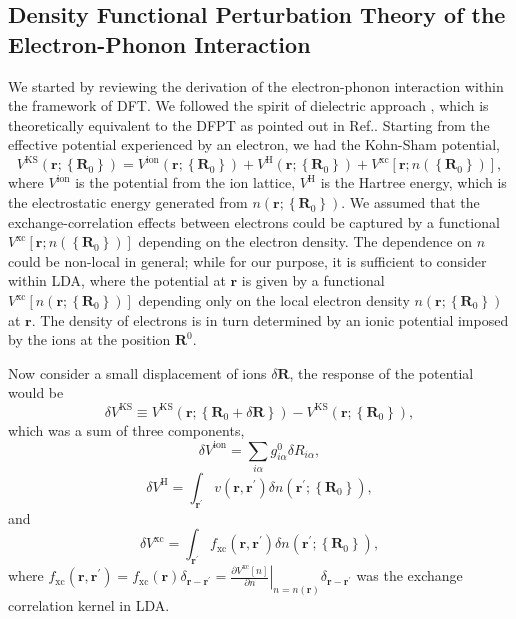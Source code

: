 \documentclass[%
 reprint,
superscriptaddress,
 amsmath,amssymb,
 aps,
prx,
]{revtex4-2}
\newcommand{\br}{\mathbf{r}}
\newcommand{\bR}{\mathbf{R}}
\newcommand{\txH}{\text{H}}
\newcommand{\txxc}{\text{xc}}
\newcommand{\txion}{\text{ion}}
\newcommand{\txKS}{\text{KS}}
\begin{document}
\begin{appendices}
\subsection{Density Functional Perturbation Theory of the Electron-Phonon Interaction}
\label{app:DFPT}
We started by reviewing the derivation of the electron-phonon interaction within the framework of DFT. 
We followed the spirit of dielectric approach \cite{dielectric1, dielectric2}, which is theoretically equivalent to the DFPT as pointed out in Ref.\cite{EPW1}.
Starting from the effective potential experienced by an electron, we had the Kohn-Sham potential,
\begin{equation}
   V^{\txKS}\left(\mathbf{r} ;\left\{\mathbf{R}_0\right\}\right)=V^{\txion}\left(\mathbf{r} ;\left\{\mathbf{R}_0\right\}\right)+V^\txH\left(\mathbf{r} ;\left\{\mathbf{R}_0\right\}\right)+V^{\txxc}[\br; n(\left\{\bR_0\right\})],
\end{equation}
where $V^{\txion}$ is the potential from the ion lattice, $V^\txH$ is the Hartree energy, which is the electrostatic energy generated from $n(\br; \left\{\bR_0\right\})$.
We assumed that the exchange-correlation effects between electrons could be captured by a functional $V^{\txxc}[\br; n(\left\{\bR_0\right\})]$ depending on the electron density.
The dependence on $n$ could be non-local in general;
while for our purpose, it is sufficient to consider within LDA, 
where the potential at $\br$ is given by a functional $V^{\txxc}[n(\br; \left\{\bR_0\right\})]$ depending only on the local electron density $n(\br; \left\{\bR_0\right\})$ at $\br$. 
The density of electrons is in turn determined by an ionic potential imposed by the ions at the position $\bR^0$. 

Now consider a small displacement of ions $\delta\bR$,
the response of the potential would be
\begin{equation}
\delta V^{\txKS} \equiv V^{\txKS}\left(\mathbf{r} ;\left\{\mathbf{R}_0+\delta \mathbf{R}\right\}\right)-V^{\txKS}\left(\mathbf{r} ;\left\{\mathbf{R}_0\right\}\right),
\end{equation}
which was a sum of three components,
\begin{equation}
  \delta V^{\txion}=\sum_{i \alpha} g^0_{i \alpha} \delta R_{i \alpha},
\end{equation}
\begin{equation}
\delta V^\txH=\int_{\mathbf{r}^{\prime}} v\left(\mathbf{r}, \mathbf{r}^{\prime}\right) \delta n\left(\mathbf{r}^{\prime} ;\left\{\mathbf{R}_0\right\}\right),
\end{equation}
and
\begin{equation}
\delta V^{\txxc}=\int_{\mathbf{r}^{\prime}} f_{\txxc}\left(\mathbf{r}, \mathbf{r}^{\prime}\right) \delta n\left(\mathbf{r}^{\prime} ;\left\{\mathbf{R}_0\right\}\right),
\end{equation}
where $f_{\txxc}\left(\mathbf{r}, \mathbf{r}^{\prime}\right)=f_{\txxc}\left(\br\right)\delta_{\br-\br^\prime}=\left.\frac{\partial V^{\txxc}[n]}{\partial n}\right|_{n=n(\br)} \delta_{\br-\br^\prime}$ was the exchange correlation kernel in LDA.


\end{appendices}
\end{document}
